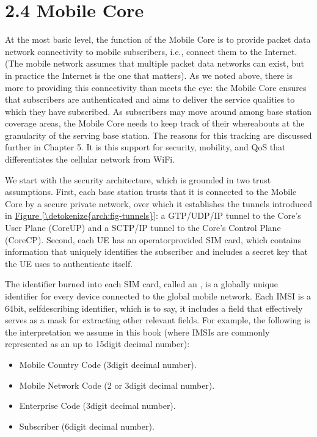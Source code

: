 \documentclass[a4paper,11pt,english]{sphinxmanual}
\begin{document}
\section{2.4 Mobile Core}
\label{\detokenize{arch:mobile-core}}
\sphinxAtStartPar
At the most basic level, the function of the Mobile Core is to provide
packet data network connectivity to mobile subscribers, i.e., connect
them to the Internet. (The mobile network assumes that multiple packet
data networks can exist, but in practice the Internet is the one that
matters). As we noted above, there is more to providing this
connectivity than meets the eye: the Mobile Core ensures that
subscribers are authenticated and aims to deliver the service
qualities to which they have subscribed. As subscribers may move
around among base station coverage areas, the Mobile Core needs to
keep track of their whereabouts at the granularity of the serving
base station. The reasons for this tracking are discussed further in
Chapter 5. It is this support for security, mobility, and QoS that
differentiates the cellular network from Wi\sphinxhyphen{}Fi.

\sphinxAtStartPar
We start with the security architecture, which is grounded in two
trust assumptions. First, each base station trusts that it is
connected to the Mobile Core by a secure private network, over which
it establishes the tunnels introduced in \hyperref[\detokenize{arch:fig-tunnels}]{Figure \ref{\detokenize{arch:fig-tunnels}}}: a GTP/UDP/IP tunnel to the Core’s User Plane (Core\sphinxhyphen{}UP)
and a SCTP/IP tunnel to the Core’s Control Plane (Core\sphinxhyphen{}CP). Second,
each UE has an operator\sphinxhyphen{}provided SIM card, which contains information
that uniquely identifies the subscriber and includes a secret key that
the UE uses to authenticate itself.

\sphinxAtStartPar
The identifier burned into each SIM card, called an , is a globally unique
identifier for every device connected to the global mobile network.
Each IMSI is a 64\sphinxhyphen{}bit, self\sphinxhyphen{}describing identifier, which is to say,
it includes a  field that effectively serves as a mask for
extracting other relevant fields. For example, the following is the
interpretation we assume in this book (where IMSIs are commonly
represented as an up to 15\sphinxhyphen{}digit decimal number):
\begin{itemize}
\item {} 
\sphinxAtStartPar
{} Mobile Country Code (3\sphinxhyphen{}digit decimal number).

\item {} 
\sphinxAtStartPar
{} Mobile Network Code (2 or 3\sphinxhyphen{}digit decimal number).

\item {} 
\sphinxAtStartPar
{} Enterprise Code (3\sphinxhyphen{}digit decimal number).

\item {} 
\sphinxAtStartPar
{} Subscriber (6\sphinxhyphen{}digit decimal number).

\end{itemize}
\end{document}
